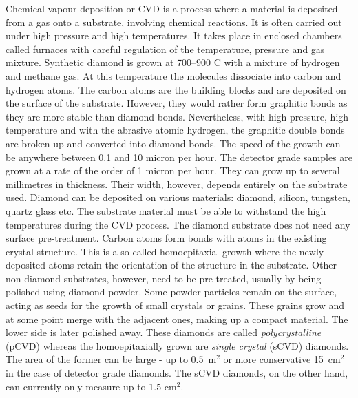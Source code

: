 \documentclass[twoside,12pt]{packages/mytustyle}  %
\let\origdescription\description
\renewenvironment{description}{
  \setlength{\leftmargini}{0em}
  \origdescription
  \setlength{\itemindent}{0em}
  \setlength{\labelsep}{\textwidth}
}
{\endlist}
\begin{document}
\begin{description}
\item[Chemical vapour deposition] Chemical vapour deposition or CVD is a process where a material is deposited from a gas onto a substrate, involving chemical reactions. It is often carried out under high pressure and high temperatures. It takes place in enclosed chambers called furnaces with careful regulation of the temperature, pressure and gas mixture. Synthetic diamond is grown at 700--900 \textdegree C with a mixture of hydrogen and methane gas. At this temperature the molecules dissociate into carbon and hydrogen atoms. The carbon atoms are the building blocks and are deposited on the surface of the substrate. However, they would rather form graphitic bonds as they are more stable than diamond bonds. Nevertheless, with high pressure, high temperature and with the abrasive atomic hydrogen, the graphitic double bonds are broken up and converted into diamond bonds. The speed of the growth can be anywhere between 0.1 and 10 micron per hour. The detector grade samples are grown at a rate of the order of 1 micron per hour. They can grow up to several millimetres in thickness. Their width, however, depends entirely on the substrate used. Diamond can be deposited on various materials: diamond, silicon, tungsten, quartz glass etc. The substrate material must be able to withstand the high temperatures during the CVD process. The diamond substrate does not need any surface pre-treatment. Carbon atoms form bonds with atoms in the existing crystal structure. This is a so-called homoepitaxial growth where the newly deposited atoms retain the orientation of the structure in the substrate. Other non-diamond substrates, however, need to be pre-treated, usually by being polished using diamond powder. Some powder particles remain on the surface, acting as seeds for the growth of small crystals or grains. These grains grow and at some point merge with the adjacent ones, making up a compact material. The lower side is later polished away. These diamonds are called \emph{polycrystalline} (pCVD) whereas the homoepitaxially grown are \emph{single crystal} (sCVD) diamonds. The area of the former can be large - up to 0.5~m$^2$ or more conservative 15~cm$^2$ in the case of detector grade diamonds. The sCVD diamonds, on the other hand, can currently only measure up to 1.5 cm$^2$.
\end{description}





\end{document}
